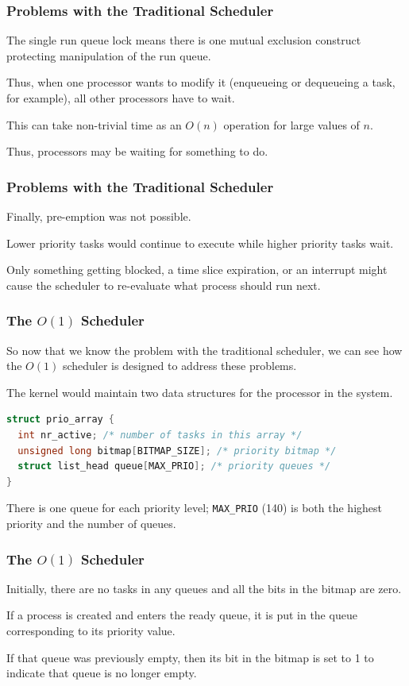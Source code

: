 \begin{frame}
\frametitle{Problems with the Traditional Scheduler}

The single run queue lock means there is one mutual exclusion construct protecting manipulation of the run queue. 

Thus, when one processor wants to modify it (enqueueing or dequeueing a task, for example), all other processors have to wait.

This can take non-trivial time as an $O(n)$ operation for large values of $n$.


Thus, processors may be waiting for something to do.

\end{frame}

\begin{frame}
\frametitle{Problems with the Traditional Scheduler}

Finally, pre-emption was not possible. 

Lower priority tasks would continue to execute while higher priority tasks wait. 

Only something getting blocked, a time slice expiration, or an interrupt might cause the scheduler to re-evaluate what process should run next.


\end{frame}

\begin{frame}[fragile]
\frametitle{The $O(1)$ Scheduler}

So now that we know the problem with the traditional scheduler, we can see how the $O(1)$ scheduler is designed to address these problems. 

The kernel would maintain two data structures for the processor in the system.

\begin{lstlisting}[language=C]
struct prio_array {
  int nr_active; /* number of tasks in this array */
  unsigned long bitmap[BITMAP_SIZE]; /* priority bitmap */
  struct list_head queue[MAX_PRIO]; /* priority queues */
}
\end{lstlisting}

There is one queue for each priority level; \texttt{MAX\_PRIO} (140) is both the highest priority and the number of queues. 

\end{frame}

\begin{frame}
\frametitle{The $O(1)$ Scheduler}

Initially, there are no tasks in any queues and all the bits in the bitmap are zero. 

If a process is created and enters the ready queue, it is put in the queue corresponding to its priority value. 

If that queue was previously empty, then its bit in the bitmap is set to 1 to indicate that queue is no longer empty.


\end{frame}

